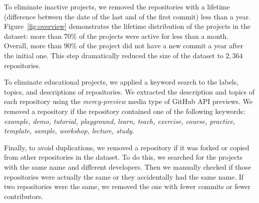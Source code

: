 To eliminate inactive projects, we removed the repositories with a lifetime 
(difference between the date of the last and of the first commit)
less than a year. 
Figure~\ref{fig:overview} demonstrates the lifetime distribution of the 
projects in the dataset: more than $70\%$ of the projects 
were active for less than a month. Overall, more than $90\%$ 
of the project did not have a new commit a year after the initial one. 
This step dramatically reduced the size of the dataset to $2,364$ 
repositories.

To eliminate educational projects, 
we applied a keyword search to the labels, topics, and 
descriptions of repositories. We extracted the description 
and topics of each repository using the \emph{mercy-preview} media 
type of GitHub API previews. We removed a repository 
if the repository contained one of the following keywords: 
\emph{example, demo, tutorial, playground, learn, teach, exercise, 
	course, practice, template, sample, workshop, lecture, study}.

Finally, to avoid duplications, we removed a repository if it was forked 
or copied from other repositories in the dataset. To do this, we 
searched for the projects with the same name and different developers. 
Then we manually checked if those repositories were actually the same or 
they accidentally had the same name. If two repositories were the same, 
we removed the one with fewer commits or fewer contributors.





